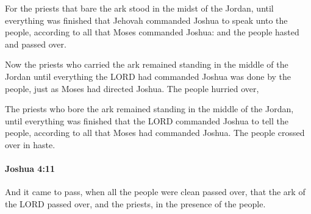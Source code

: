			\begin{versebox}
					\item[BHS] 
					\item[ASV] For the priests that bare the ark stood in the midst of the Jordan, until everything was finished that Jehovah commanded Joshua to speak unto the people, according to all that Moses commanded Joshua: and the people hasted and passed over.
					\item[NIV] Now the priests who carried the ark remained standing in the middle of the Jordan until everything the LORD had commanded Joshua was done by the people, just as Moses had directed Joshua. The people hurried over,
					\item[NRSV] The priests who bore the ark remained standing in the middle of the Jordan, until everything was finished that the LORD commanded Joshua to tell the people, according to all that Moses had commanded Joshua. The people crossed over in haste.
			\end{versebox}

		\paragraph{Joshua 4:11} %
			\label{JOSHUA-4-11}

			And it came to pass, when all the people were clean passed over, that the ark of the LORD passed over, and the priests, in the presence of the people.

